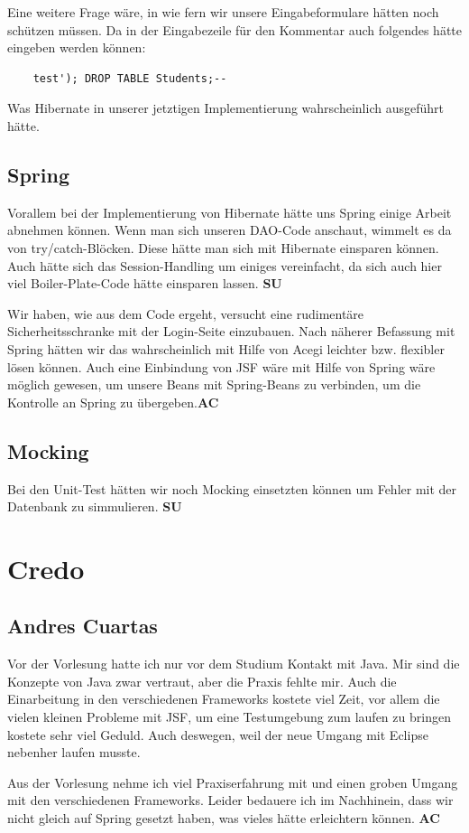 \documentclass[titlepage, 12pt,a4paper]{scrartcl}
\begin{document}
Eine weitere Frage wäre, in wie fern wir unsere Eingabeformulare hätten noch schützen müssen.
Da in der Eingabezeile für den Kommentar auch folgendes hätte eingeben werden können:
\begin{lstlisting}
	test'); DROP TABLE Students;--
\end{lstlisting}
Was Hibernate in unserer jetztigen Implementierung wahrscheinlich ausgeführt hätte.
\subsection{Spring}
Vorallem bei der Implementierung von Hibernate hätte uns Spring einige Arbeit abnehmen können. Wenn man
sich unseren DAO-Code anschaut, wimmelt es da von try/catch-Blöcken. Diese hätte man sich mit Hibernate
einsparen können. Auch hätte sich das Session-Handling um einiges vereinfacht, da sich auch hier 
viel Boiler-Plate-Code hätte einsparen lassen.
{\bf{SU}}

Wir haben, wie aus dem Code ergeht, versucht eine rudimentäre
Sicherheitsschranke mit der Login-Seite einzubauen. Nach näherer Befassung mit
Spring hätten wir das wahrscheinlich mit Hilfe von Acegi leichter bzw.
flexibler lösen können. Auch eine Einbindung von JSF wäre mit Hilfe von Spring
wäre möglich gewesen, um unsere Beans mit Spring-Beans zu verbinden, um die
Kontrolle an Spring zu übergeben.{\bf{AC}}

\subsection{Mocking}
Bei den Unit-Test hätten wir noch Mocking einsetzten können um Fehler mit der Datenbank zu simmulieren.
{\bf{SU}}
\section{Credo}
\subsection{Andres Cuartas}
Vor der Vorlesung hatte ich nur vor dem Studium Kontakt mit Java. Mir sind die
Konzepte von Java zwar vertraut, aber die Praxis fehlte mir. Auch die
Einarbeitung in den verschiedenen Frameworks kostete viel Zeit, vor allem die
vielen kleinen Probleme mit JSF, um eine Testumgebung zum laufen zu bringen
kostete sehr viel Geduld. Auch deswegen, weil der neue Umgang mit Eclipse
nebenher laufen musste. 

Aus der Vorlesung nehme ich viel Praxiserfahrung mit und einen groben Umgang
mit den verschiedenen Frameworks. Leider bedauere ich im Nachhinein, dass wir
nicht gleich auf Spring gesetzt haben, was vieles hätte erleichtern können. 
{\bf{AC}}
\end{document}

